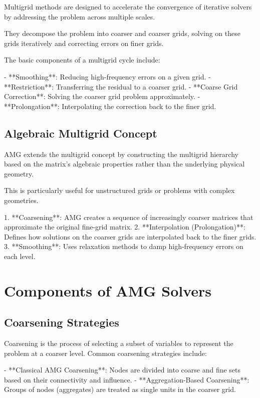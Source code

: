 Multigrid methods are designed to accelerate the convergence of iterative solvers by addressing the problem across multiple scales. 

They decompose the problem into coarser and coarser grids, solving on these grids iteratively and correcting errors on finer grids. 

The basic components of a multigrid cycle include:

- **Smoothing**: Reducing high-frequency errors on a given grid.
- **Restriction**: Transferring the residual to a coarser grid.
- **Coarse Grid Correction**: Solving the coarser grid problem approximately.
- **Prolongation**: Interpolating the correction back to the finer grid.

\subsection{Algebraic Multigrid Concept}

AMG extends the multigrid concept by constructing the multigrid hierarchy based on the matrix's algebraic properties rather than the underlying physical geometry.

This is particularly useful for unstructured grids or problems with complex geometries.

1. **Coarsening**: AMG creates a sequence of increasingly coarser matrices that approximate the original fine-grid matrix.
2. **Interpolation (Prolongation)**: Defines how solutions on the coarser grids are interpolated back to the finer grids.
3. **Smoothing**: Uses relaxation methods to damp high-frequency errors on each level.

\section{Components of AMG Solvers}

\subsection{Coarsening Strategies}

Coarsening is the process of selecting a subset of variables to represent the problem at a coarser level. Common coarsening strategies include:

- **Classical AMG Coarsening**: Nodes are divided into coarse and fine sets based on their connectivity and influence.
- **Aggregation-Based Coarsening**: Groups of nodes (aggregates) are treated as single units in the coarser grid.

